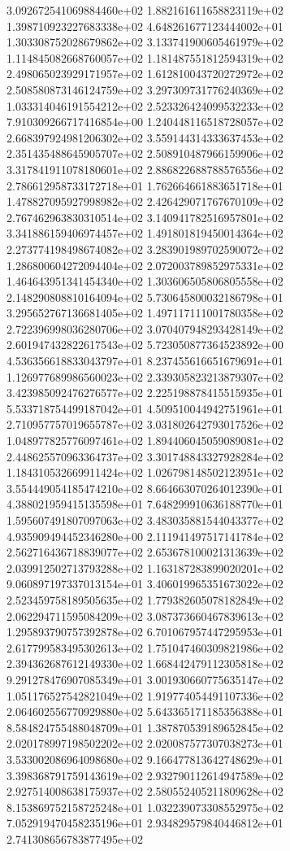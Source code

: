 3.092672541069884460e+02 1.882161611658823119e+02 1.398710923227683338e+02
4.648261677123444002e+01 1.303308752028679862e+02 3.133741900605461979e+02
1.114845082668760057e+02 1.181487551812594319e+02 2.498065023929171957e+02
1.612810043720272972e+02 2.508580873146124759e+02 3.297309731776240369e+02
1.033314046191554212e+02 2.523326424099532233e+02 7.910309266717416854e+00
1.240448116518728057e+02 2.668397924981206302e+02 3.559144314333637453e+02
2.351435488645905707e+02 2.508910487966159906e+02 3.317841911078180601e+02
2.886822688788576556e+02 2.786612958733172718e+01 1.762664661883651718e+01
1.478827095927998982e+02 2.426429071767670109e+02 2.767462963830310514e+02
3.140941782516957801e+02 3.341886159406974457e+02 1.491801819450014364e+02
2.273774198498674082e+02 3.283901989702590072e+02 1.286800604272094404e+02
2.072003789852975331e+02 1.464643951341454340e+02 1.303606505806805558e+02
2.148290808810164094e+02 5.730645800032186798e+01 3.295652767136681405e+02
1.497117111001780358e+02 2.722396998036280706e+02 3.070407948293428149e+02
2.601947432822617543e+02 5.723050877364523892e+00 4.536356618833043797e+01
8.237455616651679691e+01 1.126977689986560023e+02 2.339305823213879307e+02
3.423985092476276577e+02 2.225198878415515935e+01 5.533718754499187042e+01
4.509510044942751961e+01 2.710957757019655787e+02 3.031802642793017526e+02
1.048977825776097461e+02 1.894406045059089081e+02 2.448625570963364737e+02
3.301748843327928284e+02 1.184310532669911424e+02 1.026798148502123951e+02
3.554449054185474210e+02 8.664663070264012390e+01 4.388021959415135598e+01
7.648299910636188770e+01 1.595607491807097063e+02 3.483035881544043377e+02
4.935909494452346280e+00 2.111941497517141784e+02 2.562716436718839077e+02
2.653678100021313639e+02 2.039912502713793288e+02 1.163187283899020201e+02
9.060897197337013154e+01 3.406019965351673022e+02 2.523459758189505635e+02
1.779382605078182849e+02 2.062294711595084209e+02 3.087373660467839613e+02
1.295893790757392878e+02 6.701067957447295953e+01 2.617799583495302613e+02
1.751047460309821986e+02 2.394362687612149330e+02 1.668442479112305818e+02
9.291278476907085349e+01 3.001930660775635147e+02 1.051176527542821049e+02
1.919774054491107336e+02 2.064602556770929880e+02 5.643365171185356388e+01
8.584824755488048709e+01 1.387870539189652845e+02 2.020178997198502202e+02
2.020087577307038273e+01 3.533002086964098680e+02 9.166477813642748629e+01
3.398368791759143619e+02 2.932790112614947589e+02 2.927514008638175937e+02
2.580552405211809628e+02 8.153869752158725248e+01 1.032239073308552975e+02
7.052919470458235196e+01 2.934829579840446812e+01 2.741308656783877495e+02
